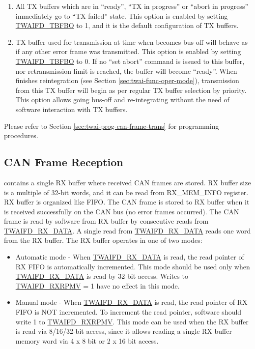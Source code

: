 \documentclass[main\_\_EN.tex]{subfiles}
\begin{document}
\begin{enumerate}
    \item All TX buffers which are in ``ready'', ``TX in progress'' or ``abort in progress'' immediately go to ``TX failed'' state. This option is enabled by setting \hyperref[fielddesc:TWAIFDTBFBO]{TWAIFD\_TBFBO} to 1, and it is the default configuration of TX buffers.
    \item TX buffer used for transmission at time when \modulename{} becomes bus-off will behave as if any other error frame was transmitted. This option is enabled by setting \hyperref[fielddesc:TWAIFDTBFBO]{TWAIFD\_TBFBO} to 0. If no ``set abort'' command is issued to this buffer, nor retransmission limit is reached, the buffer will become ``ready''. When \modulename{} finishes reintegration (see Section \ref{sec:twai-func-oper-mode}), transmission from this TX buffer will begin as per regular TX buffer selection by priority. This option allows going bus-off and re-integrating without the need of software interaction with TX buffers.
\end{enumerate}

Please refer to Section \ref{sec:twai-prog-can-frame-trans} \textit{} for programming procedures.


\subsection{CAN Frame Reception}

\modulename{} contains a single RX buffer where received CAN frames are stored. RX buffer size is a multiple of 32-bit words, and it can be read from RX\_MEM\_INFO register. RX buffer is organized like FIFO. The CAN frame is stored to RX buffer when it is received successfully on the CAN bus (no error frames occurred). The CAN frame is read by software from RX buffer by consecutive reads from \hyperref[regdesc:TWAIFDRXDATAREG]{TWAIFD\_RX\_DATA}. A single read from \hyperref[regdesc:TWAIFDRXDATAREG]{TWAIFD\_RX\_DATA} reads one word from the RX buffer. The RX buffer operates in one of two modes:
\begin{itemize}
    \item Automatic mode - When \hyperref[regdesc:TWAIFDRXDATAREG]{TWAIFD\_RX\_DATA} is read, the read pointer of RX FIFO is automatically incremented. This mode should be used only when \hyperref[regdesc:TWAIFDRXDATAREG]{TWAIFD\_RX\_DATA} is read by 32-bit access. Writes to \hyperref[fielddesc:TWAIFDRXRPMV]{TWAIFD\_RXRPMV} = 1 have no effect in this mode.
    \item Manual mode - When \hyperref[regdesc:TWAIFDRXDATAREG]{TWAIFD\_RX\_DATA} is read, the read pointer of RX FIFO is NOT incremented. To increment the read pointer, software should write 1 to \hyperref[fielddesc:TWAIFDRXRPMV]{TWAIFD\_RXRPMV}. This mode can be used when the RX buffer is read via 8/16/32-bit access, since it allows reading a single RX buffer memory word via 4 x 8 bit or 2 x 16 bit access.
\end{itemize}
\end{document}
